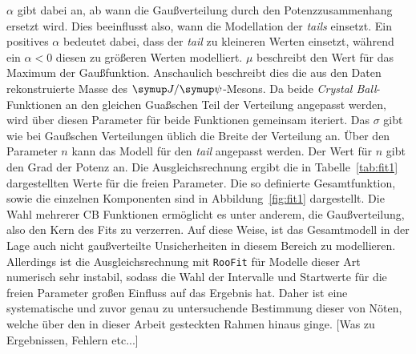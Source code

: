 %
$\alpha$ gibt dabei an, ab wann die Gaußverteilung durch den Potenzzusammenhang ersetzt wird. Dies beeinflusst also, wann die Modellation der \textit{tails}
einsetzt. Ein positives $\alpha$ bedeutet dabei, dass der \textit{tail} zu kleineren Werten einsetzt, während ein $\alpha<0$
diesen zu größeren Werten modelliert. $\mu$ beschreibt den Wert für das Maximum der Gaußfunktion. Anschaulich beschreibt dies die aus
den Daten rekonstruierte Masse des $\jpsi$-Mesons. Da beide \textit{Crystal Ball}-Funktionen an den gleichen Guaßschen Teil der Verteilung angepasst werden,
wird über diesen Parameter für beide Funktionen gemeinsam iteriert. Das $\sigma$ gibt wie bei Gaußschen Verteilungen üblich die Breite der Verteilung an. Über den Parameter $n$ kann das Modell für den \textit{tail} angepasst werden. Der Wert für $n$ gibt den Grad der Potenz an.
Die Ausgleichsrechnung ergibt die in Tabelle~\ref{tab:fit1} dargestellten Werte für die freien Parameter. Die so definierte Gesamtfunktion, sowie die einzelnen Komponenten sind in Abbildung~\ref{fig:fit1} dargestellt. Die Wahl mehrerer CB Funktionen ermöglicht es unter anderem, die Gaußverteilung, also den Kern des Fits zu verzerren. Auf diese Weise, ist das Gesamtmodell in der Lage auch nicht gaußverteilte Unsicherheiten in diesem Bereich zu modellieren. Allerdings ist die Ausgleichsrechnung mit \texttt{RooFit} für Modelle dieser Art numerisch sehr instabil, sodass die Wahl der Intervalle und Startwerte für die freien Parameter großen Einfluss auf das Ergebnis hat. Daher ist eine systematische und zuvor genau zu untersuchende Bestimmung dieser von Nöten, welche über den in dieser Arbeit gesteckten Rahmen hinaus ginge. [Was zu Ergebnissen, Fehlern etc...]
%

